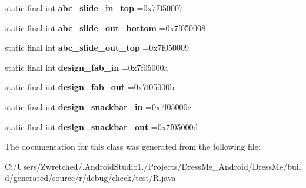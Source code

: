 \begin{DoxyCompactItemize}
\item 
\hypertarget{classcheck_1_1test_1_1_r_1_1anim_abb8ca98c2b1d61c0f9df7de708de4fba}{}static final int {\bfseries abc\+\_\+slide\+\_\+in\+\_\+top} =0x7f050007\label{classcheck_1_1test_1_1_r_1_1anim_abb8ca98c2b1d61c0f9df7de708de4fba}

\item 
\hypertarget{classcheck_1_1test_1_1_r_1_1anim_a866d5980440c0b9500431026f614bda0}{}static final int {\bfseries abc\+\_\+slide\+\_\+out\+\_\+bottom} =0x7f050008\label{classcheck_1_1test_1_1_r_1_1anim_a866d5980440c0b9500431026f614bda0}

\item 
\hypertarget{classcheck_1_1test_1_1_r_1_1anim_a0d89faab2f3d67b85942b8131e01986d}{}static final int {\bfseries abc\+\_\+slide\+\_\+out\+\_\+top} =0x7f050009\label{classcheck_1_1test_1_1_r_1_1anim_a0d89faab2f3d67b85942b8131e01986d}

\item 
\hypertarget{classcheck_1_1test_1_1_r_1_1anim_a4a1c8557c45300ee2158b3c3a4f88399}{}static final int {\bfseries design\+\_\+fab\+\_\+in} =0x7f05000a\label{classcheck_1_1test_1_1_r_1_1anim_a4a1c8557c45300ee2158b3c3a4f88399}

\item 
\hypertarget{classcheck_1_1test_1_1_r_1_1anim_ab987a6911348ee831094fd28756dbb23}{}static final int {\bfseries design\+\_\+fab\+\_\+out} =0x7f05000b\label{classcheck_1_1test_1_1_r_1_1anim_ab987a6911348ee831094fd28756dbb23}

\item 
\hypertarget{classcheck_1_1test_1_1_r_1_1anim_a23a581ba3def9eb66568468dee440cbe}{}static final int {\bfseries design\+\_\+snackbar\+\_\+in} =0x7f05000c\label{classcheck_1_1test_1_1_r_1_1anim_a23a581ba3def9eb66568468dee440cbe}

\item 
\hypertarget{classcheck_1_1test_1_1_r_1_1anim_a89ac253d5ea7380527b5968bab465d39}{}static final int {\bfseries design\+\_\+snackbar\+\_\+out} =0x7f05000d\label{classcheck_1_1test_1_1_r_1_1anim_a89ac253d5ea7380527b5968bab465d39}

\end{DoxyCompactItemize}


The documentation for this class was generated from the following file\+:\begin{DoxyCompactItemize}
\item 
C\+:/\+Users/\+Zwretched/.\+Android\+Studio1./\+Projects/\+Dress\+Me\+\_\+\+Android/\+Dress\+Me/build/generated/source/r/debug/check/test/R.\+java\end{DoxyCompactItemize}
